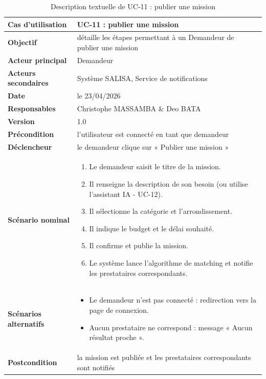 \vspace{0.2cm}
\begin{table}[H]
	\caption{Description textuelle de UC-11 : publier une mission}
	\label{tab:uc11}
	\centering
	\begin{tabular}{|p{3.5cm}|p{10cm}|}
		\hline
		\rowcolor{vertClair}
		\textbf{Cas d'utilisation} & UC-11 : publier une mission \\
		\hline
		\textbf{Objectif} & détaille les étapes permettant à un Demandeur de publier une mission \\
		\hline
		\textbf{Acteur principal} & Demandeur \\
		\hline
		\textbf{Acteurs secondaires} & Système SALISA, Service de notifications \\
		\hline
		\textbf{Date} & le 23/04/2026 \\
		\hline
		\textbf{Responsables} & Christophe MASSAMBA \& Deo BATA \\
		\hline
		\textbf{Version} & 1.0 \\
		\hline
		\textbf{Précondition} & l'utilisateur est connecté en tant que demandeur \\
		\hline
		\textbf{Déclencheur} & le demandeur clique sur « Publier une mission » \\
		\hline
		\textbf{Scénario nominal} &
		\begin{enumerate}
			\item Le demandeur saisit le titre de la mission.
			\item Il renseigne la description de son besoin (ou utilise l'assistant IA - UC-12).
			\item Il sélectionne la catégorie et l'arrondissement.
			\item Il indique le budget et le délai souhaité.
			\item Il confirme et publie la mission.
			\item Le système lance l'algorithme de matching et notifie les prestataires correspondants.
		\end{enumerate} \\
		\hline
		\textbf{Scénarios alternatifs} &
		\begin{itemize}
			\item Le demandeur n'est pas connecté : redirection vers la page de connexion.
			\item Aucun prestataire ne correspond : message « Aucun résultat proche ».
		\end{itemize} \\
		\hline
		\textbf{Postcondition} & la mission est publiée et les prestataires correspondants sont notifiés \\
		\hline
	\end{tabular}
\end{table}

